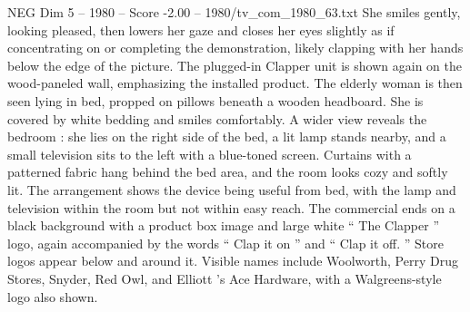 \begin{textsample}{NEG Dim 5 – 1980 – Score -2.00 – 1980/tv\_com\_1980\_63.txt}
She smiles gently, looking pleased, then lowers her gaze and closes her eyes slightly as if concentrating on or completing the demonstration, likely clapping with her hands below the edge of the picture.
The plugged-in Clapper unit is shown again on the wood-paneled wall, emphasizing the installed product.
The elderly woman is then seen lying in bed, propped on pillows beneath a wooden headboard.
She is covered by white bedding and smiles comfortably.
A wider view reveals the bedroom : she lies on the right side of the bed, a lit lamp stands nearby, and a small television sits to the left with a blue-toned screen.
Curtains with a patterned fabric hang behind the bed area, and the room looks cozy and softly lit.
The arrangement shows the device being useful from bed, with the lamp and television within the room but not within easy reach.
The commercial ends on a black background with a product box image and large white “ The Clapper ” logo, again accompanied by the words “ Clap it on ” and “ Clap it off. ” Store logos appear below and around it.
Visible names include Woolworth, Perry Drug Stores, Snyder, Red Owl, and Elliott ’s Ace Hardware, with a Walgreens-style logo also shown.

\end{textsample}
